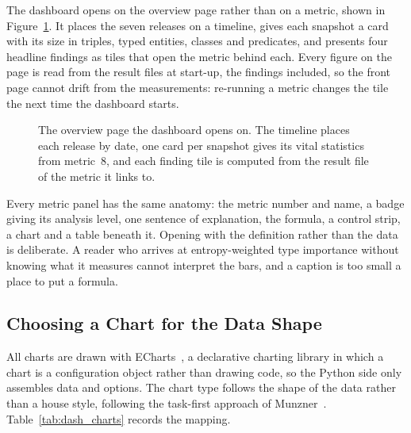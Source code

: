 The dashboard opens on the overview page rather than on a metric, shown in
Figure~\ref{fig:dash_home}. It places the seven releases on a timeline, gives each
snapshot a card with its size in triples, typed entities, classes and predicates,
and presents four headline findings as tiles that open the metric behind each.
Every figure on the page is read from the result files at start-up, the findings
included, so the front page cannot drift from the measurements: re-running a
metric changes the tile the next time the dashboard starts.

\begin{figure}[htbp]
  \centering
  \caption[]{The overview page the dashboard opens on. The
    timeline places each release by date, one card per snapshot gives its vital
    statistics from metric~8, and each finding tile is computed from the result
    file of the metric it links to.}
  \label{fig:dash_home}
\end{figure}

Every metric panel has the same anatomy: the metric number and name, a badge
giving its analysis level, one sentence of explanation, the formula, a control
strip, a chart and a table beneath it. Opening with the definition rather than
the data is deliberate. A reader who arrives at entropy-weighted type importance
without knowing what it measures cannot interpret the bars, and a caption is too
small a place to put a formula.

\subsection{Choosing a Chart for the Data Shape}
\label{subsec:dash_charts}

All charts are drawn with ECharts~\cite{li2018echarts}, a declarative charting
library in which a chart is a configuration object rather than drawing code, so
the Python side only assembles data and options. The chart type follows the
shape of the data rather than a house style, following the task-first approach of
Munzner~\cite{munzner2014visualization}. Table~\ref{tab:dash_charts} records the
mapping.

